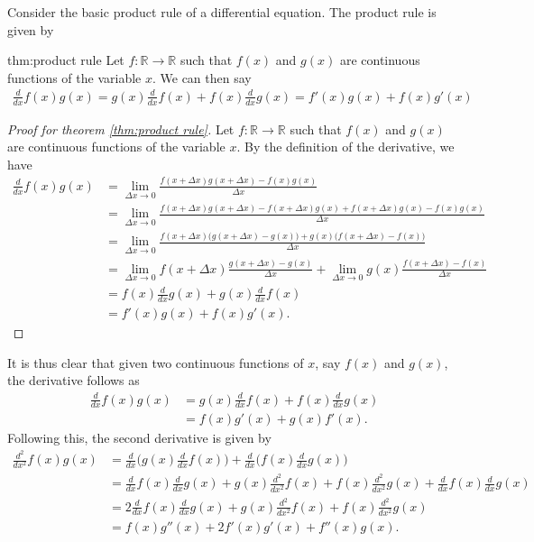 Consider the basic product rule of a differential equation. The product rule is given by
\begin{theo}{thm:product rule}
	Let $f:\mathbb{R}\rightarrow\mathbb{R}$ such that $f(x)$ and $g(x)$ are continuous functions of the variable $x$. We can then say
	\begin{align*}
		\frac{d}{dx}f(x)g(x)=g(x)\frac{d}{dx}f(x)+f(x)\frac{d}{dx}g(x)=f'(x)g(x)+f(x)g'(x)
	\end{align*}
\end{theo}
\begin{proof}[Proof for theorem \ref{thm:product rule}]
	Let $f:\mathbb{R}\rightarrow\mathbb{R}$ such that $f(x)$ and $g(x)$ are continuous functions of the variable $x$. By the definition of the derivative, we have
	\begin{align*}
		\frac{d}{dx}f(x)g(x)&=\lim\limits_{\Delta x \rightarrow 0}\frac{f(x+\Delta x)g(x+\Delta x)-f(x)g(x)}{\Delta x} \\
		&=\lim\limits_{\Delta x \rightarrow 0}\frac{f(x+\Delta x)g(x+\Delta x)-f(x+\Delta x)g(x)+f(x+\Delta x)g(x)-f(x)g(x)}{\Delta x} \\
		&=\lim\limits_{\Delta x \rightarrow 0}\frac{f(x+\Delta x)\big(g(x+\Delta x)-g(x)\big)+g(x)\big(f(x+\Delta x)-f(x)\big)}{\Delta x} \\
		&=\lim\limits_{\Delta x \rightarrow 0}f(x+\Delta x)\frac{g(x+\Delta x)-g(x)}{\Delta x}+\lim\limits_{\Delta x \rightarrow 0}g(x)\frac{f(x+\Delta x)-f(x)}{\Delta x} \\
		&=f(x)\frac{d}{dx}g(x)+g(x)\frac{d}{dx}f(x) \\&=f'(x)g(x)+f(x)g'(x).
	\end{align*}
\end{proof}
It is thus clear that given two continuous functions of $x$, say $f(x)$ and $g(x)$, the derivative follows as
\begin{align}
	\frac{d}{dx}f(x)g(x)&=g(x)\frac{d}{dx}f(x)+f(x)\frac{d}{dx}g(x) \\
	&=f(x)g'(x)+g(x)f'(x).
\end{align}
Following this, the second derivative is given by
\begin{align}
	\frac{d^2}{dx^2}f(x)g(x)&=\frac{d}{dx}\bigg(g(x)\frac{d}{dx}f(x)\bigg)+\frac{d}{dx}\bigg(f(x)\frac{d}{dx}g(x)\bigg) \\
	&=\frac{d}{dx}f(x)\frac{d}{dx}g(x)+g(x)\frac{d^2}{dx^2}f(x)+f(x)\frac{d^2}{dx^2}g(x)+\frac{d}{dx}f(x)\frac{d}{dx}g(x) \\
	&=2\frac{d}{dx}f(x)\frac{d}{dx}g(x)+g(x)\frac{d^2}{dx^2}f(x)+f(x)\frac{d^2}{dx^2}g(x) \\
	&= f(x)g''(x)+2f'(x)g'(x)+f''(x)g(x).
\end{align}
